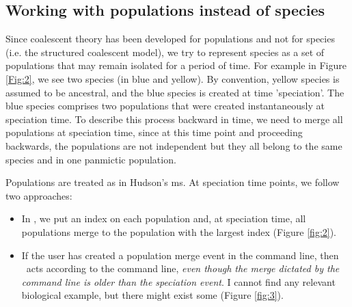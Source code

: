 \subsection{ Working with populations instead of species }
Since coalescent theory has been developed for populations and not for species (i.e. the structured coalescent model), we try to represent species as a set of populations that may remain isolated for a period of time. For example in Figure \ref{Fig:2}, we see two species (in blue and yellow). By convention, yellow species is assumed to be ancestral, and the blue species is created at time 'speciation'. The blue species comprises two populations that were created instantaneously at speciation time. To describe this process backward in time, we need to merge all populations at speciation time, since at this time point and proceeding backwards, the populations are not independent but they all belong to the same species and in one panmictic population. 

Populations are treated as in Hudson's ms. At speciation time points, we follow two approaches:
\begin{itemize}
\item In \comus, we put an index on each population and, at speciation time, all populations merge to the population with the largest index (Figure \ref{fig:2}). 
\item If the user has created a population merge event in the command line, then \comus\ acts according to the command line, \emph{even though the merge dictated by the command line is older than the speciation event}. I cannot find any relevant biological example, but there might exist some (Figure \ref{fig:3}). 
\end{itemize}
  
